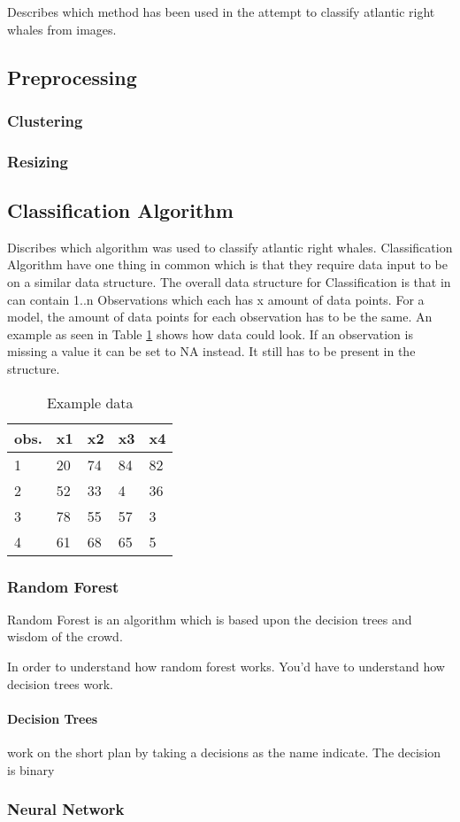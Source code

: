 Describes which method has been used in the attempt to classify atlantic right whales from images.

\subsection{Preprocessing}

\subsubsection{Clustering}

\subsubsection{Resizing}

\subsection{Classification Algorithm}
Discribes which algorithm was used to classify atlantic right whales. Classification Algorithm have one thing in common which is that they require data input to be on a similar data structure.
The overall data structure for Classification is that in can contain 1..n Observations which each has x amount of data points. For a model, the amount of data points for each observation has to be the same. An example as seen in Table \ref{tab:example data} shows how data could look.
If an observation is missing a value it can be set to NA instead. It still has to be present in the structure.

\begin{table}
  \centering
  \caption{Example data}
  \label{tab:example data}
  \begin{tabularx}{\linewidth}{|l|X|X|X|X|} \hline
    obs. & x1 & x2 & x3 & x4 \\ \hline
    1    & 20 & 74 & 84 & 82 \\ \hline
    2    & 52 & 33 & 4  & 36 \\ \hline
    3    & 78 & 55 & 57 & 3  \\ \hline
    4    & 61 & 68 & 65 & 5  \\ \hline
  \end{tabularx}
\end{table}

\subsubsection{Random Forest}
Random Forest is an algorithm which is based upon the decision trees and wisdom of the crowd.

In order to understand how random forest works. You'd have to understand how decision trees work.
\paragraph{Decision Trees} work on the short plan by taking a decisions as the name indicate. The decision is binary

\subsubsection{Neural Network}